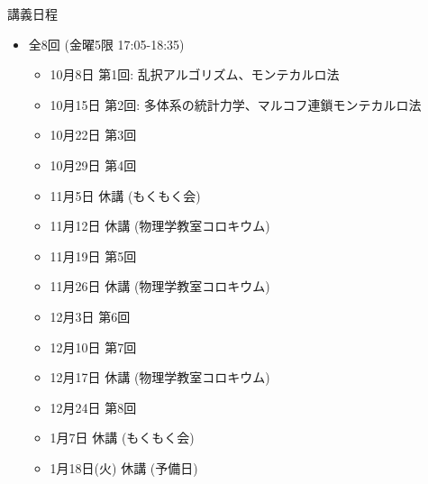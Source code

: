 \begin{frame}[t]{講義日程}
  \begin{itemize}
  \item 全8回 (金曜5限 {\color{red}17:05}-18:35)
    \begin{itemize}
    \item {\color{gray} 10月8日 第1回: 乱択アルゴリズム、モンテカルロ法}
    \item 10月15日 第2回: 多体系の統計力学、マルコフ連鎖モンテカルロ法
    \item 10月22日 第3回
    \item 10月29日 第4回
    \item 11月5日 休講 (もくもく会)
    \item 11月12日 休講 (物理学教室コロキウム)
    \item 11月19日 第5回
    \item 11月26日 休講 (物理学教室コロキウム)
    \item 12月3日 第6回
    \item 12月10日 第7回
    \item 12月17日 休講 (物理学教室コロキウム)
    \item 12月24日 第8回
    \item 1月7日 休講 (もくもく会)
    \item 1月18日(火) 休講 (予備日)
    \end{itemize}
  \end{itemize}
\end{frame}
